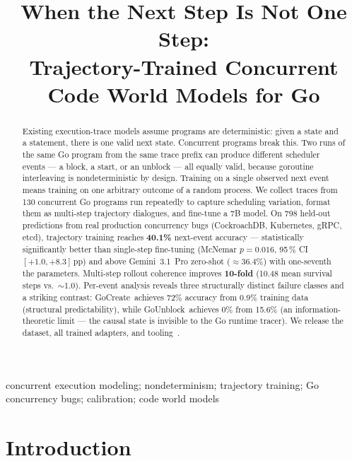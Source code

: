 \documentclass[10pt,conference]{IEEEtran}
\newcommand{\punblock}{\textsf{GoUnblock}}
\newcommand{\pcreate}{\textsf{GoCreate}}
\begin{document}
\title{When the Next Step Is Not One Step:\\
Trajectory-Trained Concurrent Code World Models for Go}

\author{}

\maketitle

\begin{abstract}
Existing execution-trace models assume programs are deterministic: given
a state and a statement, there is one valid next state.
Concurrent programs break this.
Two runs of the same Go program from the same trace prefix can produce
different scheduler events — a block, a start, or an unblock — all
equally valid, because goroutine interleaving is nondeterministic by
design.
Training on a single observed next event means training on one arbitrary
outcome of a random process.
We collect traces from 130 concurrent Go programs run repeatedly to
capture scheduling variation, format them as multi-step trajectory
dialogues, and fine-tune a 7B model.
On 798 held-out predictions from real production concurrency bugs
(CockroachDB, Kubernetes, gRPC, etcd), trajectory training reaches
\textbf{40.1\%} next-event accuracy — statistically significantly better
than single-step fine-tuning (McNemar $p{=}0.016$, 95\,\%
CI~$[+1.0,+8.3]$\,pp) and above Gemini~3.1~Pro zero-shot
($\approx\!36.4$\%) with one-seventh the parameters.
Multi-step rollout coherence improves \textbf{10-fold} (10.48 mean
survival steps vs.\ $\sim$1.0).
Per-event analysis reveals three structurally distinct failure classes
and a striking contrast: \pcreate\ achieves 72\% accuracy from 0.9\%
training data (structural predictability), while \punblock\ achieves
0\% from 15.6\% (an information-theoretic limit — the causal state is
invisible to the Go runtime tracer).
We release the dataset, all trained adapters, and
tooling~\cite{anon-artifacts}.
\end{abstract}

\begin{IEEEkeywords}
concurrent execution modeling; nondeterminism; trajectory training;
Go concurrency bugs; calibration; code world models
\end{IEEEkeywords}

\section{Introduction}\label{sec:intro}
\end{document}
